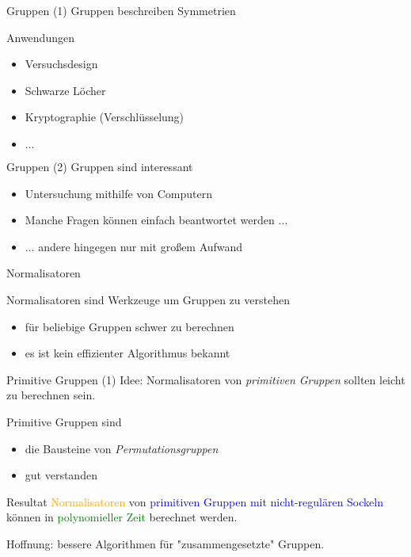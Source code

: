\begin{frame}{Gruppen (1)}
Gruppen beschreiben Symmetrien

Anwendungen
\begin{itemize}
\item Versuchsdesign
\item Schwarze Löcher
\item Kryptographie (Verschlüsselung)
\item $\ldots$
\end{itemize}
\end{frame}

\begin{frame}{Gruppen (2)}
Gruppen sind interessant
\begin{itemize}
\item Untersuchung mithilfe von Computern
\item Manche Fragen können einfach beantwortet werden $\ldots$
\item $\ldots$ andere hingegen nur mit großem Aufwand
\end{itemize}
\end{frame}

\begin{frame}{Normalisatoren}

Normalisatoren sind Werkzeuge um Gruppen zu verstehen

\begin{itemize}
\item für beliebige Gruppen schwer zu berechnen
\item es ist kein effizienter Algorithmus bekannt
\end{itemize}
\end{frame}

\begin{frame}{Primitive Gruppen (1)}
Idee: Normalisatoren von \emph{primitiven Gruppen} sollten leicht zu berechnen
sein.

Primitive Gruppen sind
\begin{itemize}
\item die Bausteine von \emph{Permutationsgruppen}
\item gut verstanden
\end{itemize}
\end{frame}

\begin{frame}{Resultat}
\textcolor{orange}{Normalisatoren}
\pause
von
\textcolor{blue}{primitiven Gruppen mit nicht-regulären Sockeln}
\pause
können in
\textcolor{green}{polynomieller Zeit}
berechnet werden.

\pause
Hoffnung:
bessere Algorithmen für "zusammengesetzte" Gruppen.
\end{frame}

